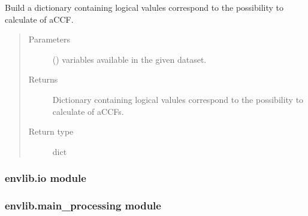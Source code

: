 \documentclass[a4paper,11pt,english]{sphinxmanual}
\begin{document}

\begin{fulllineitems}
\label{\detokenize{envlib:envlib.extract_data.logic_cal_accfs}}
Build a dictionary containing logical valules correspond to the possibility to calculate of aCCF.
\begin{quote}\begin{description}
\item[{Parameters}] \leavevmode
{} () \textendash{} variables available in the given dataset.

\item[{Returns}] \leavevmode
Dictionary containing logical valules correspond to the possibility to calculate of aCCFs.

\item[{Return type}] \leavevmode
dict

\end{description}\end{quote}

\end{fulllineitems}



\subsubsection{envlib.io module}
\label{\detokenize{envlib:module-envlib.io}}\label{\detokenize{envlib:envlib-io-module}}

\subsubsection{envlib.main\_processing module}
\label{\detokenize{envlib:module-envlib.main_processing}}\label{\detokenize{envlib:envlib-main-processing-module}}
\end{document}
